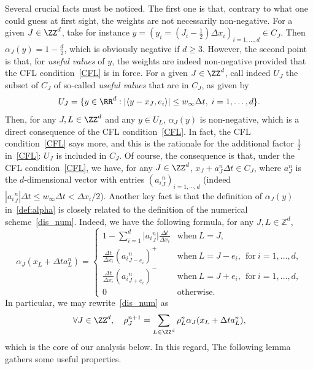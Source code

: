 Several crucial facts must be noticed. The first one is that, contrary to what one could guess at first sight, the weights are not necessarily non-negative. For a given $J \in \ZZ^d$, take for instance $y=(y_{i}=(J_{i}-\tfrac12) \Delta x_{i})_{i=1,\dots,d}\in C_{J}$. Then $\alpha_{J}(y) = 1 - \tfrac{d}{2}$, which is obviously negative if $d\geq 3$. However, the second point is that, for \emph{useful values} of $y$, the weights are indeed non-negative provided that the CFL condition~\eqref{CFL} is in force. For a given $J \in \ZZ^d$, call indeed $U_{J}$ the subset of $C_{J}$ of so-called \emph{useful values} that are in $C_{J}$, as given by
\begin{equation*}
U_{J} = \{ y \in \RR^d : \vert \langle y - x_{J},e_{i} \rangle \vert \leq w_{\infty} \Delta t, \; i = 1,\dots,d \}.
\end{equation*}
Then, for any $J,L \in \ZZ^d$ and any $y \in U_{L}$, $\alpha_{J}(y)$ is non-negative, which is a direct consequence of the CFL condition~\eqref{CFL}. In fact, the CFL condition~\eqref{CFL} says more, and this is the rationale for the additional factor $\tfrac12$ in~\eqref{CFL}: $U_{J}$ is included in $C_{J}$. Of course, the consequence is that, under the CFL condition~\eqref{CFL}, we have, for any $J\in\ZZ^d$, $x_J+a_J^n\Delta t \in C_J$, where $a^n_{J}$ is the $d$-dimensional vector with entries $({a_i}^n_{J})_{i=1,\cdots,d}$ (indeed $|{a_{i}}_J^n| \Delta t \leq w_\infty \Delta t < \Delta x_i/2$). Another key fact is that the definition of $\alpha_{J}(y)$ in~\eqref{def:alpha} is closely related to the definition of the numerical scheme~\eqref{dis_num}. Indeed, we have the following formula, for any $J,L \in {\mathbb Z}^d$,
\begin{equation}\label{eq:transition:probas}
\alpha_{J} (x_{L} + \Delta t a^n_{L}
) =
\begin{cases}
 1-\sum_{i=1}^d \vert {a_{i}}^n_{J} \vert \frac{\Delta t}{\Delta x_i} & \text{when} \ L=J,
\\[0.25em]
 \frac{\Delta t}{\Delta x_i}({a_{i}}^n_{J-e_{i}} )^{+} &\text{when} \ L = J-e_{i}, \ \ \text{for} \ i= 1,\dots,d,
\\[0.25em]
 \frac{\Delta t}{\Delta x_i}({a_{i}}^n_{J+e_{i}} )^{-} &\text{when} \ L = J+e_{i}, \ \ \text{for} \ i= 1,\dots,d,
\\[0.25em]
0 &\text{otherwise}.
\end{cases}
\end{equation}
In particular, we may rewrite~\eqref{dis_num} as
\begin{equation}\label{scheme3}
\forall J \in \ZZ^d, \quad \rho^{n+1}_J = \sum_{L\in\ZZ^d} \rho^n_L \alpha_{J}(x_L+\Delta t a^n_L),
\end{equation}
which is the core of our analysis below. In this regard, The following lemma gathers some useful properties.

